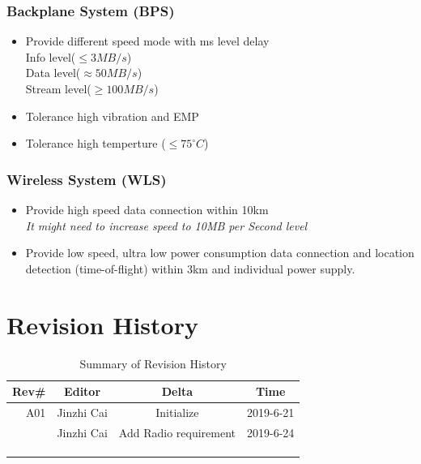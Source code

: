 \documentclass[12pt,article]{memoir}
\begin{document}
\subsection{Backplane System (BPS)}
\begin{itemize}
\item Provide different speed mode with ms level delay \\
Info level($\leq 3MB/s$)\\
Data level($\approx 50MB/s$)\\
Stream level($\geq 100MB/s$)
\item Tolerance high vibration and EMP
\item Tolerance high temperture ($\leq 75^{\circ}C$)
\end{itemize}
\subsection{Wireless System (WLS)}
\begin{itemize}
\item Provide high speed data connection within 10km\\
	\textit{It might need to increase speed to 10MB per Second level}
\item Provide low speed, ultra low power consumption data connection and location detection (time-of-flight) within 3km and individual power supply.
\end{itemize}
\chapter{Revision History}
\begin{table}[H]
	\centering
	\begin{tabu}{r || c | c | c }
		Rev\# & Editor & Delta & Time\\ \hline
		A01 & Jinzhi Cai & Initialize  & 2019-6-21 \\
		 & Jinzhi Cai & Add Radio requirement & 2019-6-24 \\ \hline
		 & & & \\
		 & & & \\
		 & & & \\
	\end{tabu}
	\caption{Summary of Revision History}
	\label{tab:edatools}
\end{table}

\end{document}
